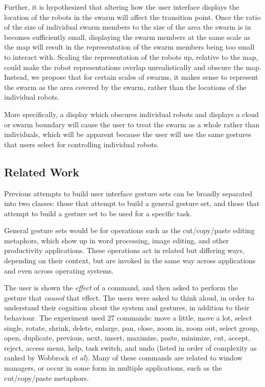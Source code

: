 Further, it is hypothesized that altering how the user interface displays the location of the robots in the swarm will affect the transition point.
Once the ratio of the size of individual swarm members to the size of the area the swarm is in becomes sufficiently small, displaying the swarm members at the same scale as the map will result in the representation of the swarm members being too small to interact with. 
Scaling the representation of the robots up, relative to the map, could make the robot representations overlap unrealistically and obscure the map. 
Instead, we propose that for certain scales of swarms, it makes sense to represent the swarm as the area covered by the swarm, rather than the locations of the individual robots.
 
More specifically, a display which obscures individual robots and displays a cloud or swarm boundary will cause the user to treat the swarm as a whole rather than individuals, which will be apparent because the user will use the same gestures that users select for controlling individual robots. 

\subsection{Related Work}

Previous attempts to build user interface gesture sets can be broadly separated into two classes: those that attempt to build a general gesture set, and those that attempt to build a gesture set to be used for a specific task. 

General gesture sets would be for operations such as the cut/copy/paste editing metaphors, which show up in word processing, image editing, and other productivity applications. 
These operations act in related but differing ways, depending on their context, but are invoked in the same way across applications and even across operating systems. 

The user is shown the \textit{effect} of a command, and then asked to perform the gesture that \textit{caused} that effect. 
The users were asked to think aloud, in order to understand their cognition about the system and gestures, in addition to their behaviour. 
The experiment used 27 commands: move a little, move a lot, select single, rotate, shrink, delete, enlarge, pan, close, zoom in, zoom out, select group, open, duplicate, previous, next, insert, maximize, paste, minimize, cut, accept, reject, access menu, help, task switch, and undo (listed in order of complexity as ranked by Wobbrock \textit{et al}).
Many of these commands are related to window managers, or occur in some form in multiple applications, such as the cut/copy/paste metaphors.

